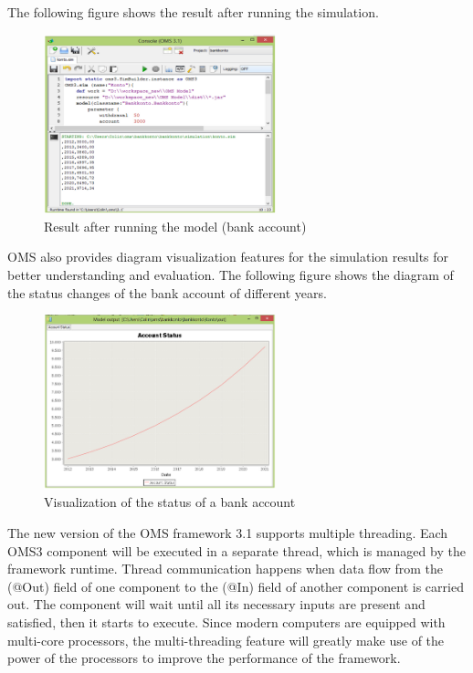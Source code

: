 The following figure shows the result after running the simulation.
\begin{figure}[htbp]
\centering
\includegraphics[width=0.6\textwidth]{pics/oms/Figure9.png}
\caption{Result after running the model (bank account)}
\label{fig:Result after running the model (bank account)}
\end{figure}

OMS also provides diagram visualization features for the simulation results for better understanding and evaluation. The following figure shows the diagram of the status changes of the bank account of different years.
\begin{figure}[htbp]
\centering
\includegraphics[width=0.6\textwidth]{pics/oms/Figure10.png}
\caption{Visualization of the status of a bank account}
\label{fig:Visualization of the status of a bank account}
\end{figure}

The new version of the OMS framework 3.1 supports multiple threading. Each OMS3 component will be executed in a separate thread, which is managed by the framework runtime. Thread communication happens when data flow from the (@Out) field of one component to the (@In) field of another component is carried out. The component will wait until all its necessary inputs are present and satisfied, then it starts to execute. Since modern computers are equipped with multi-core processors, the multi-threading feature will greatly make use of the power of the processors to improve the performance of the framework.

